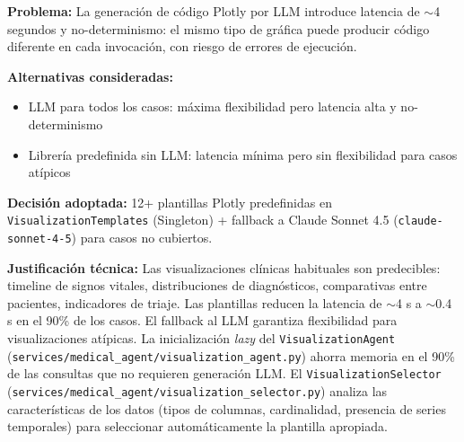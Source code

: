 \begin{tcolorbox}[
  enhanced, breakable,
  colback=orange!4, colframe=orange!45,
  title={\footnotesize\sffamily\bfseries Decisión 4 — Enfoque template-first en visualización (vs.\ generación LLM para todo)},
  fonttitle=\color{white},
  attach boxed title to top left={yshift=-2mm, xshift=4mm},
  boxed title style={colback=orange!55, rounded corners},
  left=4pt, right=4pt, top=4pt, bottom=4pt
]
\footnotesize
\textbf{Problema:} La generación de código Plotly por LLM introduce latencia de $\sim$4 segundos y no-determinismo: el mismo tipo de gráfica puede producir código diferente en cada invocación, con riesgo de errores de ejecución.

\textbf{Alternativas consideradas:}
\begin{itemize}[nosep, leftmargin=*]
  \item LLM para todos los casos: máxima flexibilidad pero latencia alta y no-determinismo
  \item Librería predefinida sin LLM: latencia mínima pero sin flexibilidad para casos atípicos
\end{itemize}

\textbf{Decisión adoptada:} 12+ plantillas Plotly predefinidas en \texttt{VisualizationTemplates} (Singleton) + fallback a Claude Sonnet 4.5 (\texttt{claude-sonnet-4-5}) para casos no cubiertos.

\textbf{Justificación técnica:} Las visualizaciones clínicas habituales son predecibles: timeline de signos vitales, distribuciones de diagnósticos, comparativas entre pacientes, indicadores de triaje. Las plantillas reducen la latencia de $\sim$4 s a $\sim$0.4 s en el 90\% de los casos. El fallback al LLM garantiza flexibilidad para visualizaciones atípicas. La inicialización \textit{lazy} del \texttt{VisualizationAgent} (\texttt{services/medical\_agent/visualization\_agent.py}) ahorra memoria en el 90\% de las consultas que no requieren generación LLM. El \texttt{VisualizationSelector} (\texttt{services/medical\_agent/visualization\_selector.py}) analiza las características de los datos (tipos de columnas, cardinalidad, presencia de series temporales) para seleccionar automáticamente la plantilla apropiada.
\end{tcolorbox}

